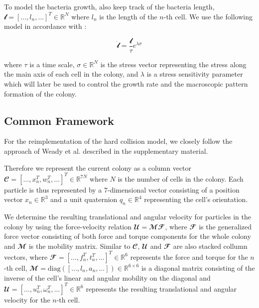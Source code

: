 \documentclass[conference]{IEEEtran}
\begin{document}

To model the bacteria growth, also keep track of the bacteria length, $\mathbfcal{l} = [\dots, l_n, \dots]^T \in \mathbb{R}^{N}$ where $l_n$ is the length of the $n$-th cell. We use the following model in accordance with \cite{Weady2024}:

$$
    \dot{\mathbfcal{l}} =  \frac{\mathbfcal{l}}{\tau} e^{\lambda \mathbfcal{\sigma}}
$$

where $\tau$ is a time scale, $\mathbfcal{\sigma} \in \mathbb{R}^{N}$ is the stress vector representing the stress along the main axis of each cell in the colony, and $\lambda$ is a stress sensitivity parameter which will later be used to control the growth rate and the macroscopic pattern formation of the colony.



\subsection{Common Framework}


For the reimplementation of the hard collision model, we closely follow the approach of Weady et al. \cite{Weady2024} described in the supplementary material.

Therefore we represent the current colony as a column vector $\mathbfcal{C} = [\dots, x_n^T, w_n^T, \dots]^T \in \mathbb{R}^{7N}$ where $N$ is the number of cells in the colony. Each particle is thus represented by a 7-dimensional vector consisting of a position vector $x_n \in \mathbb{R}^3$ and a unit quaternion $q_n \in \mathbb{R}^4$ representing the cell's orientation.

We determine the resulting translational and angular velocity for particles in the colony by using the force-velocity relation $\mathbfcal{U} = \mathbfcal{M} \mathbfcal{F}$, where $\mathbfcal{F}$ is the generalized force vector consisting of both force and torque components for the whole colony and $\mathbfcal{M}$ is the mobility matrix. Similar to $\mathbfcal{C}$, $\mathbfcal{U}$ and $\mathbfcal{F}$ are also stacked collumn vectors, where $\mathbfcal{F} = [\dots, f_n^T, t_n^T, \dots]^T \in \mathbb{R}^{6}$ represents the force and torque for the $n$-th cell, $\mathbfcal{M} = \text{diag}([\dots, l_n, a_n, \dots]) \in \mathbb{R}^{6 \times 6}$ is a diagonal matrix consisting of the inverse of the cell's linear and angular mobility on the diagonal and $\mathbfcal{U} = [\dots, u_n^T, \omega_n^T, \dots]^T \in \mathbb{R}^{6}$ represents the resulting translational and angular velocity for the $n$-th cell.
\end{document}
